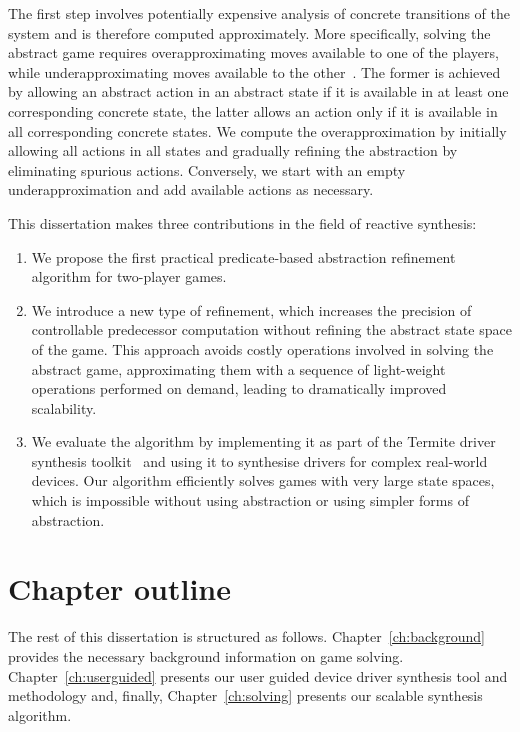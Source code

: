 The first step involves potentially expensive analysis of concrete transitions of the system and is therefore computed approximately.  More specifically, solving the abstract game requires overapproximating moves available to one of the players, while underapproximating moves available to the other~\cite{Henzinger_JM_03}.  The former is achieved by allowing an abstract action in an abstract state if it is available in at least one corresponding concrete state, the latter allows an action only if it is available in all corresponding concrete states.  We compute the overapproximation by initially allowing all actions in all states and gradually refining the abstraction by eliminating spurious actions.  Conversely, we start with an empty underapproximation and add available actions as necessary.

This dissertation makes three contributions in the field of reactive synthesis:
\begin{enumerate}
    \item We propose the first practical predicate-based abstraction refinement algorithm for two-player games.

    \item We introduce a new type of refinement, which increases the precision of controllable predecessor computation without refining the abstract state space of the game.  This approach avoids costly operations involved in solving the abstract game, approximating them with a sequence of light-weight operations performed on demand, leading to dramatically improved scalability.

    \item We evaluate the algorithm by implementing it as part of the Termite driver synthesis toolkit~\cite{Ryzhyk_WKLRSV_14} and using it to synthesise drivers for complex real-world devices.  Our algorithm efficiently solves games with very large state spaces, which is impossible without using abstraction or using simpler forms of abstraction.
\end{enumerate}

\section{Chapter outline}

The rest of this dissertation is structured as follows. Chapter~\ref{ch:background} provides the necessary background information on game solving. Chapter~\ref{ch:userguided} presents our user guided device driver synthesis tool and methodology and, finally, Chapter~\ref{ch:solving} presents our scalable synthesis algorithm.
